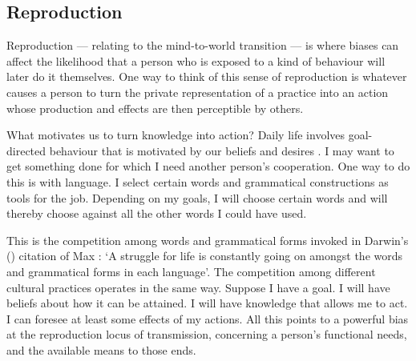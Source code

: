\subsection{Reproduction}
Reproduction --- relating to the mind-to-world transition --- is where biases can affect the likelihood that a person who is exposed to a kind of behaviour will later do it themselves. One way to think of this sense of reproduction is whatever causes a 
person to turn the private representation of a practice into an action 
whose production and effects are then perceptible by others.



What motivates us to turn knowledge into action? Daily life involves 
goal-directed behaviour that is motivated by our beliefs and desires  
\citep{davidson_essential_2006,searle_intentionality:_1983,fodor_psychosemantics_1987}. I may want to get 
something done for which I need another person's cooperation. One way to do this is with language. I select certain words and 
grammatical constructions as tools for the job. Depending on my goals, I will choose
certain words and will thereby choose against all the other words I 
could have used. 



This is the competition among words and grammatical forms invoked in 
Darwin's (\citeyear[60]{darwin_descent_1871}) citation of Max \citet{muller_darwinism_1870}: \textquoteleft A struggle for 
life is constantly going on amongst the words and grammatical forms in 
each language'. The competition among different cultural practices 
operates in the same way. Suppose I have a goal. I will have beliefs about 
how it can be attained. I will have knowledge that allows me to act. I can foresee at least some effects of my actions. All this 
points to a powerful bias at the reproduction locus of transmission, concerning a person's functional needs, and the available means to those ends. 



